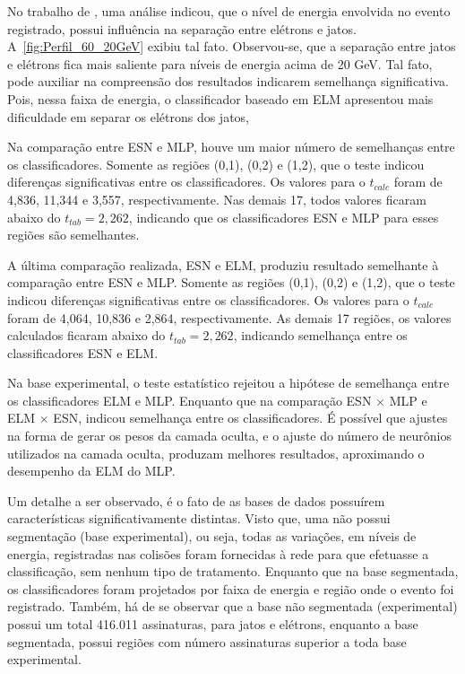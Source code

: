 No trabalho de , uma análise indicou, que o nível de energia envolvida no evento registrado, possui influência na separação entre elétrons e jatos. A~\autoref{fig:Perfil_60_20GeV} exibiu tal fato. Observou-se, que a separação entre jatos e elétrons fica mais saliente para níveis de energia acima de 20 GeV. Tal fato, pode auxiliar na compreensão dos resultados indicarem semelhança significativa. Pois, nessa faixa de energia, o classificador baseado em ELM apresentou mais dificuldade em separar os elétrons dos jatos,

Na comparação entre ESN e MLP, houve um maior número de semelhanças entre os classificadores. Somente as regiões (0,1), (0,2) e (1,2), que o teste indicou diferenças significativas entre os classificadores. Os valores para o $t_{calc}$ foram de 4,836, 11,344 e 3,557, respectivamente. Nas demais 17, todos valores ficaram abaixo do $t_{tab}=2,262$, indicando que os classificadores ESN e MLP para esses regiões são semelhantes.

A última comparação realizada, ESN e ELM, produziu resultado semelhante à comparação entre ESN e MLP. Somente as regiões (0,1), (0,2) e (1,2), que o teste indicou diferenças significativas entre os classificadores.  Os valores para o $t_{calc}$ foram de 4,064, 10,836 e 2,864, respectivamente. As demais 17 regiões, os valores calculados ficaram abaixo do $t_{tab}=2,262$, indicando semelhança entre os classificadores ESN e ELM.

Na base experimental, o teste estatístico rejeitou a hipótese de semelhança entre os classificadores ELM e MLP. Enquanto que na comparação ESN $\times$ MLP e ELM $\times$ ESN, indicou semelhança entre os classificadores. É possível que ajustes na forma de gerar os pesos da camada oculta, e o ajuste do número de neurônios utilizados na camada oculta, produzam melhores resultados, aproximando o desempenho da ELM do MLP.

Um detalhe a ser observado, é o fato de as bases de dados possuírem características significativamente distintas. Visto que, uma não possui segmentação (base experimental), ou seja, todas as variações, em níveis de energia, registradas nas colisões foram fornecidas à rede para que efetuasse a classificação, sem nenhum tipo de tratamento. Enquanto que na base segmentada, os classificadores foram projetados por faixa de energia e região onde o evento foi registrado. Também, há de se observar que a base não segmentada (experimental) possui um total 416.011 assinaturas, para jatos e elétrons, enquanto a base segmentada, possui regiões com número assinaturas superior a toda base experimental.

